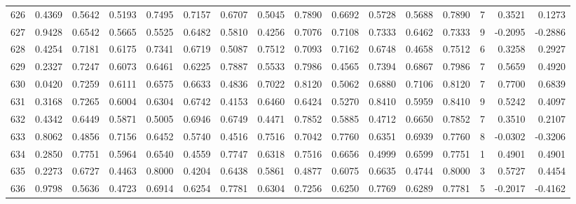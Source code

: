 \begin{tabular}{lrrrrrrrrrrrrrrr}
626 &      0.4369 &  0.5642 &  0.5193 &  0.7495 &  0.7157 &  0.6707 &  0.5045 &  0.7890 &  0.6692 &  0.5728 &   0.5688 &     0.7890 &      7 &                    0.3521 &                     0.1273 \\
627 &      0.9428 &  0.6542 &  0.5665 &  0.5525 &  0.6482 &  0.5810 &  0.4256 &  0.7076 &  0.7108 &  0.7333 &   0.6462 &     0.7333 &      9 &                   -0.2095 &                    -0.2886 \\
628 &      0.4254 &  0.7181 &  0.6175 &  0.7341 &  0.6719 &  0.5087 &  0.7512 &  0.7093 &  0.7162 &  0.6748 &   0.4658 &     0.7512 &      6 &                    0.3258 &                     0.2927 \\
629 &      0.2327 &  0.7247 &  0.6073 &  0.6461 &  0.6225 &  0.7887 &  0.5533 &  0.7986 &  0.4565 &  0.7394 &   0.6867 &     0.7986 &      7 &                    0.5659 &                     0.4920 \\
630 &      0.0420 &  0.7259 &  0.6111 &  0.6575 &  0.6633 &  0.4836 &  0.7022 &  0.8120 &  0.5062 &  0.6880 &   0.7106 &     0.8120 &      7 &                    0.7700 &                     0.6839 \\
631 &      0.3168 &  0.7265 &  0.6004 &  0.6304 &  0.6742 &  0.4153 &  0.6460 &  0.6424 &  0.5270 &  0.8410 &   0.5959 &     0.8410 &      9 &                    0.5242 &                     0.4097 \\
632 &      0.4342 &  0.6449 &  0.5871 &  0.5005 &  0.6946 &  0.6749 &  0.4471 &  0.7852 &  0.5885 &  0.4712 &   0.6650 &     0.7852 &      7 &                    0.3510 &                     0.2107 \\
633 &      0.8062 &  0.4856 &  0.7156 &  0.6452 &  0.5740 &  0.4516 &  0.7516 &  0.7042 &  0.7760 &  0.6351 &   0.6939 &     0.7760 &      8 &                   -0.0302 &                    -0.3206 \\
634 &      0.2850 &  0.7751 &  0.5964 &  0.6540 &  0.4559 &  0.7747 &  0.6318 &  0.7516 &  0.6656 &  0.4999 &   0.6599 &     0.7751 &      1 &                    0.4901 &                     0.4901 \\
635 &      0.2273 &  0.6727 &  0.4463 &  0.8000 &  0.4204 &  0.6438 &  0.5861 &  0.4877 &  0.6075 &  0.6635 &   0.4744 &     0.8000 &      3 &                    0.5727 &                     0.4454 \\
636 &      0.9798 &  0.5636 &  0.4723 &  0.6914 &  0.6254 &  0.7781 &  0.6304 &  0.7256 &  0.6250 &  0.7769 &   0.6289 &     0.7781 &      5 &                   -0.2017 &                    -0.4162 \\

\end{tabular}
